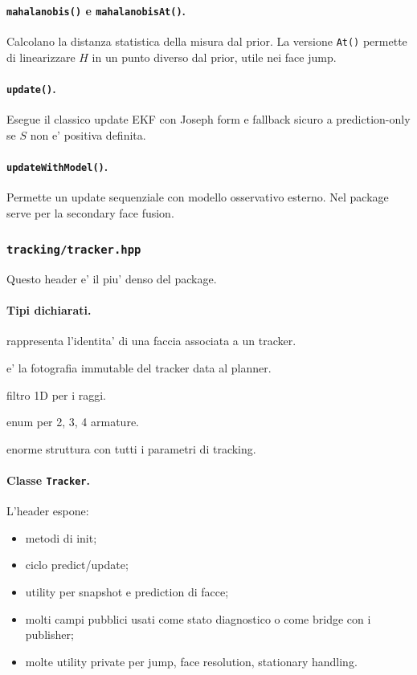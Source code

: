 \documentclass[11pt,a4paper]{article}
\newcommand{\code}[1]{\texttt{#1}}
\begin{document}
\paragraph{\code{mahalanobis()} e \code{mahalanobisAt()}.}
Calcolano la distanza statistica della misura dal prior. La versione \code{At()} permette di linearizzare \(H\) in un punto diverso dal prior, utile nei face jump.

\paragraph{\code{update()}.}
Esegue il classico update EKF con Joseph form e fallback sicuro a prediction-only se \(S\) non e' positiva definita.

\paragraph{\code{updateWithModel()}.}
Permette un update sequenziale con modello osservativo esterno. Nel package serve per la secondary face fusion.

\subsubsection{\code{tracking/tracker.hpp}}

Questo header e' il piu' denso del package.

\paragraph{Tipi dichiarati.}
\begin{description}[leftmargin=1.8em, style=nextline]
  \item[\code{FaceBinding}] rappresenta l'identita' di una faccia associata a un tracker.
  \item[\code{TrackSnapshot}] e' la fotografia immutable del tracker data al planner.
  \item[\code{ScalarKF}] filtro 1D per i raggi.
  \item[\code{ArmorsNum}] enum per 2, 3, 4 armature.
  \item[\code{TrackerConfig}] enorme struttura con tutti i parametri di tracking.
\end{description}

\paragraph{Classe \code{Tracker}.}
L'header espone:
\begin{itemize}[leftmargin=1.4em]
  \item metodi di init;
  \item ciclo predict/update;
  \item utility per snapshot e prediction di facce;
  \item molti campi pubblici usati come stato diagnostico o come bridge con i publisher;
  \item molte utility private per jump, face resolution, stationary handling.
\end{itemize}
\end{document}

